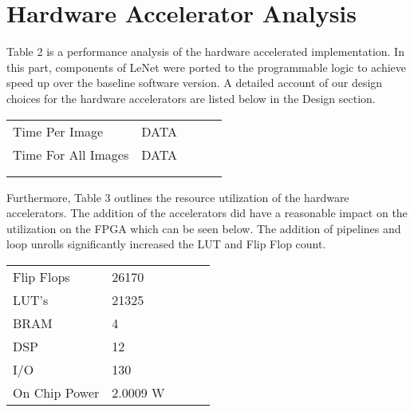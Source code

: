 \documentclass{document}  %
\begin{document}
\section{Hardware Accelerator Analysis}
Table 2 is a performance analysis of the hardware accelerated implementation. In this part,  components of LeNet were ported to the programmable logic to achieve speed up over the baseline software version.  A detailed account of our design choices for the hardware accelerators are listed below in the Design section. 

\begin{table}[H]
\begin{center}
\begin{tabular}{lllll}
\cline{1-2}
\multicolumn{1}{|l|}{Time Per Image}      & \multicolumn{1}{l|}{DATA} &  &  &  \\ \cline{1-2}
\multicolumn{1}{|l|}{Time For All Images} & \multicolumn{1}{l|}{DATA} &  &  &  \\ \cline{1-2}
                                          &                       &  &  &  \\
                                          &                       &  &  & 
\end{tabular}
\end{center}
\end{table} 

Furthermore, Table 3 outlines the resource utilization of the hardware accelerators. The addition of the accelerators did have a reasonable impact on the utilization on the FPGA which can be seen below. The addition of pipelines and loop unrolls significantly increased the LUT and Flip Flop count. 


\begin{table}[H]
\begin{center}
\begin{tabular}{|l|l|lll}
\cline{1-2}
Flip Flops    & 26170  &  &  &  \\ \cline{1-2}
LUT's         & 21325  &  &  &  \\ \cline{1-2}
BRAM          & 4      &  &  &  \\ \cline{1-2}
DSP           & 12     &  &  &  \\ \cline{1-2}
I/O           & 130    &  &  &  \\ \cline{1-2}
On Chip Power & 2.0009 W&  &  &  \\ \cline{1-2}
\end{tabular}
\end{center}
\end{table}
\end{document}
